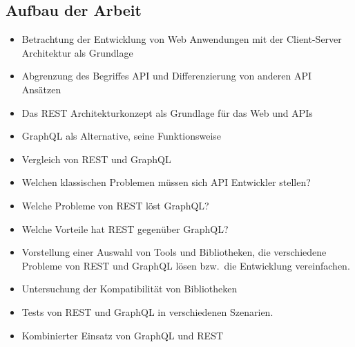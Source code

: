 \subsection{Aufbau der Arbeit}
\begin{itemize}
  \item Betrachtung der Entwicklung von Web Anwendungen mit der Client-Server Architektur als Grundlage
  \item Abgrenzung des Begriffes API und Differenzierung von anderen API Ansätzen
  \item Das REST Architekturkonzept als Grundlage für das Web und APIs
  \item GraphQL als Alternative, seine Funktionsweise
  \item Vergleich von REST und GraphQL
  \item Welchen klassischen Problemen müssen sich API Entwickler stellen?
  \item Welche Probleme von REST löst GraphQL\@?
  \item Welche Vorteile hat REST gegenüber GraphQL\@?
  \item Vorstellung einer Auswahl von Tools und Bibliotheken, die verschiedene Probleme von REST und GraphQL lösen bzw.\ die Entwicklung vereinfachen.
  \item Untersuchung der Kompatibilität von Bibliotheken
  \item Tests von REST und GraphQL in verschiedenen Szenarien.
  \item Kombinierter Einsatz von GraphQL und REST
\end{itemize}